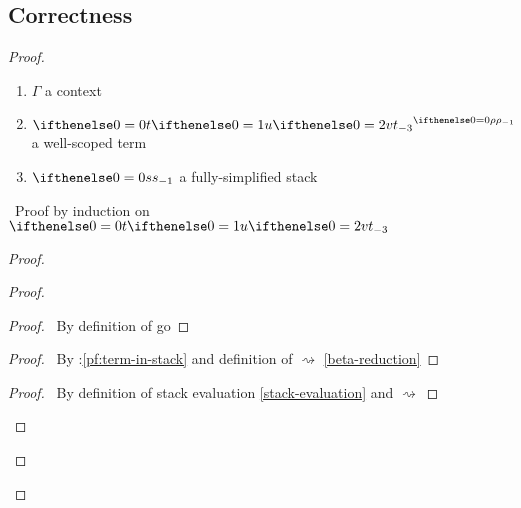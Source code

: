 \documentclass[a4paper]{article}
\begin{document}
\subsection{Correctness}
\begin{proof}
  \pflet
  {\begin{enumerate}
    \item $\Gamma$ a context
    \item $\scoped \aTerm \env$ a well-scoped term \label{pf:term-scoped}
    \item $\aStack$ a fully-simplified stack \label{pf:term-in-stack}
  \end{enumerate}}
  \pfsketch\ Proof by induction on $\aTerm$
  \begin{proof}
    \begin{proof}
      \begin{proof}
        \pf\ By definition of \textsf{go}
      \end{proof}
      \begin{proof}
        \pf\ By \toplevel:\ref{pf:term-in-stack} and definition of $\rightsquigarrow$ \ref{beta-reduction}
      \end{proof}
      \begin{proof}
        \pf\ By definition of stack evaluation \ref{stack-evaluation} and $\rightsquigarrow$
      \end{proof}

\end{proof}
\end{proof}
\end{proof}
\end{document}
